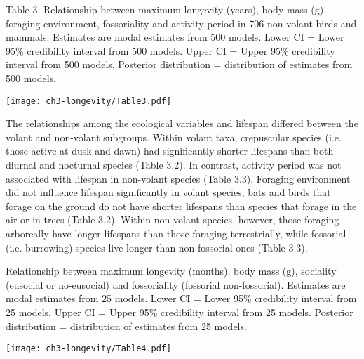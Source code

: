 \begin{table}[H]
  \caption[ ]{Table 3. Relationship between maximum longevity (years), body mass (g), foraging environment, fossoriality and activity period in 706 non-volant birds and mammals. Estimates are modal estimates from 500 models. Lower CI = Lower 95\% credibility interval from 500 models. Upper CI = Upper 95\% credibility interval from 500 models. Posterior distribution = distribution of estimates from 500 models.}
  \label{tbl:Table 3.3.}
  \texttt{[image: ch3-longevity/Table3.pdf]}
\end{table}


The relationships among the ecological variables and lifespan differed between the volant and non-volant subgroups. Within volant taxa, crepuscular species (i.e. those active at dusk and dawn) had significantly shorter lifespans than both diurnal and nocturnal species (Table 3.2). In contrast, activity period was not associated with lifespan in non-volant species (Table 3.3). Foraging environment did not influence lifespan significantly in volant species; bats and birds that forage on the ground do not have shorter lifespans than species that forage in the air or in trees (Table 3.2). Within non-volant species, however, those foraging arboreally have longer lifespans than those foraging terrestrially, while fossorial (i.e. burrowing) species live longer than non-fossorial ones (Table 3.3).

\vspace{10 mm}

\begin{table}[H]
  \caption[ ]{Relationship between maximum longevity (months), body mass (g), sociality (eusocial or no-eusocial) and fossoriality (fossorial non-fossorial). Estimates are modal estimates from 25 models. Lower CI = Lower 95\% credibility interval from 25 models. Upper CI = Upper 95\% credibility interval from 25 models. Posterior distribution = distribution of estimates from 25 models.}
  \label{tbl:Table 3.4.}
  \texttt{[image: ch3-longevity/Table4.pdf]}
\end{table}



